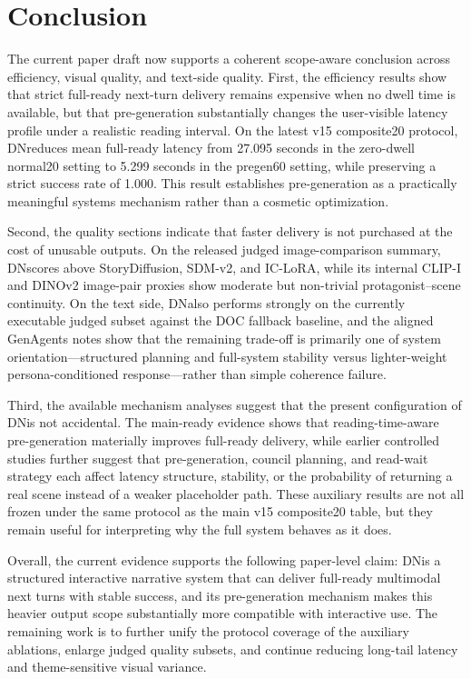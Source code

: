 ﻿\documentclass[11pt]{article}
\newcommand{\dn}{\textsc{DN}}
\begin{document}




\section{Conclusion}
The current paper draft now supports a coherent scope-aware conclusion across efficiency, visual quality, and text-side quality. First, the efficiency results show that strict full-ready next-turn delivery remains expensive when no dwell time is available, but that pre-generation substantially changes the user-visible latency profile under a realistic reading interval. On the latest v15 composite20 protocol, \dn reduces mean full-ready latency from 27.095 seconds in the zero-dwell normal20 setting to 5.299 seconds in the pregen60 setting, while preserving a strict success rate of 1.000. This result establishes pre-generation as a practically meaningful systems mechanism rather than a cosmetic optimization.

Second, the quality sections indicate that faster delivery is not purchased at the cost of unusable outputs. On the released judged image-comparison summary, \dn scores above StoryDiffusion, SDM-v2, and IC-LoRA, while its internal CLIP-I and DINOv2 image-pair proxies show moderate but non-trivial protagonist--scene continuity. On the text side, \dn also performs strongly on the currently executable judged subset against the DOC fallback baseline, and the aligned GenAgents notes show that the remaining trade-off is primarily one of system orientation---structured planning and full-system stability versus lighter-weight persona-conditioned response---rather than simple coherence failure.

Third, the available mechanism analyses suggest that the present configuration of \dn is not accidental. The main-ready evidence shows that reading-time-aware pre-generation materially improves full-ready delivery, while earlier controlled studies further suggest that pre-generation, council planning, and read-wait strategy each affect latency structure, stability, or the probability of returning a real scene instead of a weaker placeholder path. These auxiliary results are not all frozen under the same protocol as the main v15 composite20 table, but they remain useful for interpreting why the full system behaves as it does.

Overall, the current evidence supports the following paper-level claim: \dn is a structured interactive narrative system that can deliver full-ready multimodal next turns with stable success, and its pre-generation mechanism makes this heavier output scope substantially more compatible with interactive use. The remaining work is to further unify the protocol coverage of the auxiliary ablations, enlarge judged quality subsets, and continue reducing long-tail latency and theme-sensitive visual variance.
\end{document}
